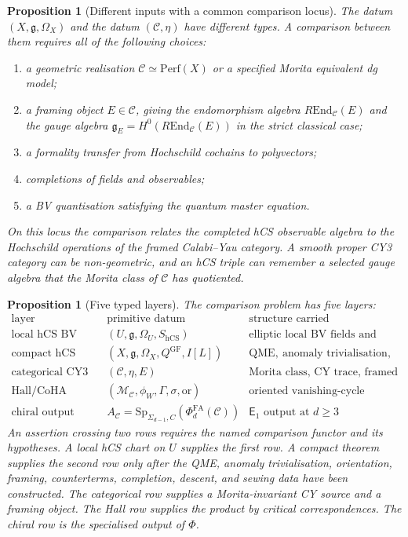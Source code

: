 \documentclass[11pt]{amsart}
\newtheorem{proposition}[theorem]{Proposition}
\theoremstyle{definition}
\theoremstyle{remark}
\providecommand{\cC}{\mathcal{C}}
\providecommand{\Eone}{\mathsf{E}_1}
\providecommand{\Perf}{\mathrm{Perf}}
\providecommand{\End}{\mathrm{End}}
\providecommand{\Sp}{\mathrm{Sp}}
\providecommand{\hCS}{\mathrm{hCS}}
\providecommand{\QME}{\mathrm{QME}}
\providecommand{\fg}{\mathfrak{g}}
\providecommand{\PhiFA}{\Phi^{\mathrm{FA}}}
\begin{document}
\begin{proposition}[Different inputs with a common comparison locus]
\label{prop:typed-inputs}
The datum $(X,\fg,\Omega_X)$ and the datum $(\cC,\eta)$ have different
types.  A comparison between them requires all of the following choices:
\begin{enumerate}[label=\textup{(\roman*)}]
\item a geometric realisation $\cC\simeq \Perf(X)$ or a specified Morita
equivalent dg model;
\item a framing object $E\in\cC$, giving the endomorphism algebra
$R\End_\cC(E)$ and the gauge algebra $\fg_E=H^0(R\End_\cC(E))$ in the
strict classical case;
\item a formality transfer from Hochschild cochains to polyvectors;
\item completions of fields and observables;
\item a BV quantisation satisfying the quantum master equation.
\end{enumerate}
On this locus the comparison relates the completed hCS observable algebra
to the Hochschild operations of the framed Calabi--Yau category.  A
smooth proper CY3 category can be non-geometric, and an hCS triple can
remember a selected gauge algebra that the Morita class of $\cC$ has
quotiented.
\end{proposition}

\begin{proposition}[Five typed layers]
\label{prop:five-typed-layers}
The comparison problem has five layers:
\[
\begin{array}{c|c|c}
\text{layer} & \text{primitive datum} & \text{structure carried}\\
\hline
\text{local hCS BV} &
(U,\fg,\Omega_U,S_{\hCS}) &
\text{elliptic local BV fields and brackets}\\
\text{compact hCS quantisation} &
(X,\fg,\Omega_X,Q^{\mathrm{GF}},I[L]) &
\QME,\ \text{anomaly trivialisation, descent, sewing}\\
\text{categorical CY3} &
(\cC,\eta,E) &
\text{Morita class, CY trace, framed endomorphisms}\\
\text{Hall/CoHA} &
(\mathcal M_\cC,\phi_W,\Gamma,\sigma,\mathrm{or}) &
\text{oriented vanishing-cycle correspondences}\\
\text{chiral output} &
A_\cC=\Sp_{\Sigma_{d-1},C}(\PhiFA_d(\cC)) &
\Eone\text{ output at }d\geq3
\end{array}
\]
An assertion crossing two rows requires the named comparison functor and
its hypotheses.  A local hCS chart on $U$ supplies the first row.  A
compact theorem supplies the second row only after the QME, anomaly
trivialisation, orientation, framing, counterterms, completion, descent,
and sewing data have been constructed.  The categorical row supplies a
Morita-invariant CY source and a framing object.  The Hall row supplies
the product by critical correspondences.  The chiral row is the
specialised output of $\Phi$.
\end{proposition}
\end{document}
